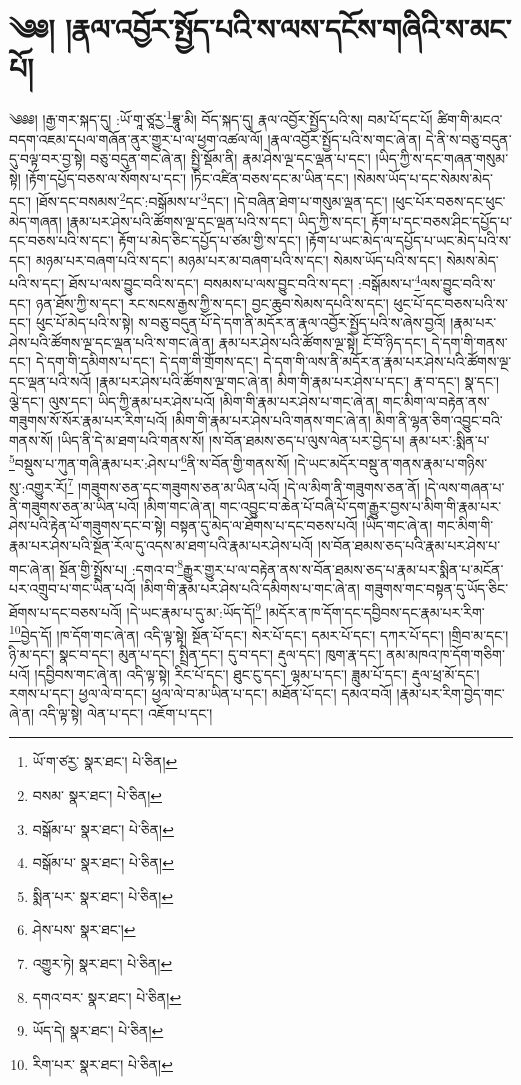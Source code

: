 \setcounter{footnote}{0} 
\chapter{༄༅། །རྣལ་འབྱོར་སྤྱོད་པའི་ས་ལས་དངོས་གཞིའི་ས་མང་པོ།}༄༅༅། །རྒྱ་གར་སྐད་དུ། :ཡོ་གཱ་ཙཱརྱ་\footnote{ཡོ་ག་ཙརྱ་  སྣར་ཐང་།  པེ་ཅིན། }བྷཱུ་མི། བོད་སྐད་དུ། རྣལ་འབྱོར་སྤྱོད་པའི་ས། བམ་པོ་དང་པོ། ཚིག་གི་མངའ་བདག་འཇམ་དཔལ་གཞོན་ནུར་གྱུར་པ་ལ་ཕྱག་འཚལ་ལོ། །རྣལ་འབྱོར་སྤྱོད་པའི་ས་གང་ཞེ་ན། དེ་ནི་ས་བཅུ་བདུན་དུ་བལྟ་བར་བྱ་སྟེ། བཅུ་བདུན་གང་ཞེ་ན། སྤྱི་སྡོམ་ནི། རྣམ་ཤེས་ལྔ་དང་ལྡན་པ་དང་། །ཡིད་ཀྱི་ས་དང་གཞན་གསུམ་སྟེ། །རྟོག་དཔྱོད་བཅས་ལ་སོགས་པ་དང་། །ཏིང་འཛིན་བཅས་དང་མ་ཡིན་དང་། །སེམས་ཡོད་པ་དང་སེམས་མེད་དང་། །ཐོས་དང་བསམས་\footnote{བསམ་  སྣར་ཐང་།  པེ་ཅིན། }དང་:བསྒོམས་པ་\footnote{བསྒོམ་པ་  སྣར་ཐང་།  པེ་ཅིན། }དང་། །དེ་བཞིན་ཐེག་པ་གསུམ་ལྡན་དང་། །ཕུང་པོར་བཅས་དང་ཕུང་མེད་གཞན། །རྣམ་པར་ཤེས་པའི་ཚོགས་ལྔ་དང་ལྡན་པའི་ས་དང་། ཡིད་ཀྱི་ས་དང་། རྟོག་པ་དང་བཅས་ཤིང་དཔྱོད་པ་དང་བཅས་པའི་ས་དང་། རྟོག་པ་མེད་ཅིང་དཔྱོད་པ་ཙམ་གྱི་ས་དང་། །རྟོག་པ་ཡང་མེད་ལ་དཔྱོད་པ་ཡང་མེད་པའི་ས་དང་། མཉམ་པར་བཞག་པའི་ས་དང་། མཉམ་པར་མ་བཞག་པའི་ས་དང་། སེམས་ཡོད་པའི་ས་དང་། སེམས་མེད་པའི་ས་དང་། ཐོས་པ་ལས་བྱུང་བའི་ས་དང་། བསམས་པ་ལས་བྱུང་བའི་ས་དང་། :བསྒོམས་པ་\footnote{བསྒོམ་པ་  སྣར་ཐང་།  པེ་ཅིན། }ལས་བྱུང་བའི་ས་དང་། ཉན་ཐོས་ཀྱི་ས་དང་། རང་སངས་རྒྱས་ཀྱི་ས་དང་། བྱང་ཆུབ་སེམས་དཔའི་ས་དང་། ཕུང་པོ་དང་བཅས་པའི་ས་དང་། ཕུང་པོ་མེད་པའི་ས་སྟེ། ས་བཅུ་བདུན་པོ་དེ་དག་ནི་མདོར་ན་རྣལ་འབྱོར་སྤྱོད་པའི་ས་ཞེས་བྱའོ། །རྣམ་པར་ཤེས་པའི་ཚོགས་ལྔ་དང་ལྡན་པའི་ས་གང་ཞེ་ན། རྣམ་པར་ཤེས་པའི་ཚོགས་ལྔ་སྟེ། ངོ་བོ་ཉིད་དང་། དེ་དག་གི་གནས་དང་། དེ་དག་གི་དམིགས་པ་དང་། དེ་དག་གི་གྲོགས་དང་། དེ་དག་གི་ལས་ནི་མདོར་ན་རྣམ་པར་ཤེས་པའི་ཚོགས་ལྔ་དང་ལྡན་པའི་སའོ། །རྣམ་པར་ཤེས་པའི་ཚོགས་ལྔ་གང་ཞེ་ན། མིག་གི་རྣམ་པར་ཤེས་པ་དང་། རྣ་བ་དང་། སྣ་དང་། ལྕེ་དང་། ལུས་དང་། ཡིད་ཀྱི་རྣམ་པར་ཤེས་པའོ། །མིག་གི་རྣམ་པར་ཤེས་པ་གང་ཞེ་ན། གང་མིག་ལ་བརྟེན་ནས་གཟུགས་སོ་སོར་རྣམ་པར་རིག་པའོ། །མིག་གི་རྣམ་པར་ཤེས་པའི་གནས་གང་ཞེ་ན། མིག་ནི་ལྷན་ཅིག་འབྱུང་བའི་གནས་སོ། །ཡིད་ནི་དེ་མ་ཐག་པའི་གནས་སོ། །ས་བོན་ཐམས་ཅད་པ་ལུས་ལེན་པར་བྱེད་པ། རྣམ་པར་:སྨིན་པ་\footnote{སྨིན་པར་  སྣར་ཐང་།  པེ་ཅིན། }བསྡུས་པ་ཀུན་གཞི་རྣམ་པར་:ཤེས་པ་\footnote{ཤེས་པས་  སྣར་ཐང་། }ནི་ས་བོན་གྱི་གནས་སོ། །དེ་ཡང་མདོར་བསྡུ་ན་གནས་རྣམ་པ་གཉིས་སུ་:འགྱུར་རོ།\footnote{འགྱུར་ཏེ།  སྣར་ཐང་།  པེ་ཅིན། } །གཟུགས་ཅན་དང་གཟུགས་ཅན་མ་ཡིན་པའོ། །དེ་ལ་མིག་ནི་གཟུགས་ཅན་ནོ། །དེ་ལས་གཞན་པ་ནི་གཟུགས་ཅན་མ་ཡིན་པའོ། །མིག་གང་ཞེ་ན། གང་འབྱུང་བ་ཆེན་པོ་བཞི་པོ་དག་རྒྱུར་བྱས་པ་མིག་གི་རྣམ་པར་ཤེས་པའི་རྟེན་པོ་གཟུགས་དང་བ་སྟེ། བསྟན་དུ་མེད་ལ་ཐོགས་པ་དང་བཅས་པའོ། །ཡིད་གང་ཞེ་ན། གང་མིག་གི་རྣམ་པར་ཤེས་པའི་སྔོན་རོལ་དུ་འདས་མ་ཐག་པའི་རྣམ་པར་ཤེས་པའོ། །ས་བོན་ཐམས་ཅད་པའི་རྣམ་པར་ཤེས་པ་གང་ཞེ་ན། སྔོན་གྱི་སྤྲོས་པ། :དགའ་བ་\footnote{དགའ་བར་  སྣར་ཐང་།  པེ་ཅིན། }རྒྱུར་གྱུར་པ་ལ་བརྟེན་ནས་ས་བོན་ཐམས་ཅད་པ་རྣམ་པར་སྨིན་པ་མངོན་པར་འགྲུབ་པ་གང་ཡིན་པའོ། །མིག་གི་རྣམ་པར་ཤེས་པའི་དམིགས་པ་གང་ཞེ་ན། གཟུགས་གང་བསྟན་དུ་ཡོད་ཅིང་ཐོགས་པ་དང་བཅས་པའོ། །དེ་ཡང་རྣམ་པ་དུ་མ་:ཡོད་དོ།\footnote{ཡོད་དེ།  སྣར་ཐང་།  པེ་ཅིན། } །མདོར་ན་ཁ་དོག་དང་དབྱིབས་དང་རྣམ་པར་རིག་\footnote{རིག་པར་  སྣར་ཐང་།  པེ་ཅིན། }བྱེད་དོ། །ཁ་དོག་གང་ཞེ་ན། འདི་ལྟ་སྟེ། སྔོན་པོ་དང་། སེར་པོ་དང་། དམར་པོ་དང་། དཀར་པོ་དང་། །གྲིབ་མ་དང་། ཉི་མ་དང་། སྣང་བ་དང་། མུན་པ་དང་། སྤྲིན་དང་། དུ་བ་དང་། རྡུལ་དང་། ཁུག་རྣ་དང་། ནམ་མཁའ་ཁ་དོག་གཅིག་པའོ། །དབྱིབས་གང་ཞེ་ན། འདི་ལྟ་སྟེ། རིང་པོ་དང་། ཐུང་ངུ་དང་། ལྷམ་པ་དང་། ཟླུམ་པོ་དང་། རྡུལ་ཕྲ་མོ་དང་། རགས་པ་དང་། ཕྱལ་ལེ་བ་དང་། ཕྱལ་ལེ་བ་མ་ཡིན་པ་དང་། མཐོན་པོ་དང་། དམའ་བའོ། །རྣམ་པར་རིག་བྱེད་གང་ཞེ་ན། འདི་ལྟ་སྟེ། ལེན་པ་དང་། འཇོག་པ་དང་། 